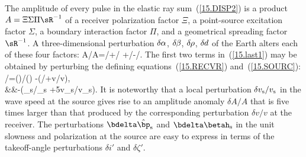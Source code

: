 {The amplitude of every pulse in the elastic ray sum~(\ref{15.DISP2})
is a product $A=\Xi\Sigma\Pi\sR^{-1}$ of a receiver polarization factor
$\Xi$, a point-source excitation factor $\Sigma$, a boundary
interaction factor $\Pi$, and a geometrical spreading factor $\sR^{-1}$.
A three-dimensional perturbation
$\delta\hspace{-0.1 mm}\alpha$, $\delta\hspace{-0.2 mm}\beta$,
$\delta\hspace{-0.2 mm}\rho$, $\delta\hspace{-0.1 mm}d$
of the Earth alters each of these four factors:
\eq \label{15.last1}
\delta A/A=\delta\Xi/\hspace{0.2 mm}\Xi+\delta\Sigma/\hspace{0.2 mm}\Sigma
+\delta\Pi/\hspace{0.2 mm}\Pi-\delta\sR/\sR.
\en
The first two terms in~(\ref{15.last1}) may be obtained by
perturbing the defining equations~(\ref{15.RECVR}) and~(\ref{15.SOURC}): 
\eq
\delta\Xi/\hspace{0.2 mm}\Xi=(\bnuh\cdot\bdelta\betah)/(\bnuh\cdot\betah)
-\half(\delta\hspace{-0.2 mm}\rho/\rho+\delta v/v),
\en
\eqa
{}
\nonumber \\
&&\mbox{}\qquad{}
-\half(\delta\hspace{-0.2 mm}\rho_{\rm s}/\hspace{-0.4 mm}\rho_{\rm s}
+5\hspace{0.4 mm}\delta v_{\rm s}/v_{\rm s}).
\ena
It is noteworthy that a local perturbation $\delta v_{\rm s}/v_{\rm s}$
in the wave speed at the source gives rise to an amplitude anomaly
$\delta A/A$ that is five times larger than that produced by the
corresponding perturbation $\delta v/v$ at the receiver.
The perturbations $\bdelta\hat{\bp}_{\rm s}$ and $\bdelta\betah_{\rm s}$
in the unit slowness and polarization at the source are easy to express
in terms of the takeoff-angle perturbations $\delta i'$ and $\delta\zeta'$.
}
